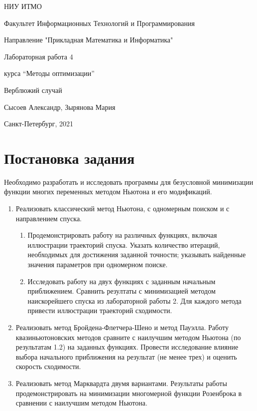 \documentclass[12pt]{article}
\begin{document}
\begin{titlepage}

\thispagestyle{empty}

\centerline{НИУ ИТМО}
\centerline{Факультет Информационных Технологий и Программирования}
\centerline{Направление "Прикладная Математика и Информатика"}

\vfill

\centerline{\huge{Лабораторная работа 4}}
\centerline{\large{курса ``Методы оптимизации'' }}
\vspace{1cm} 
\centerline{\large{Верблюжий случай}}
\centerline{\large{Сысоев Александр, Зырянова Мария}}
\vfill

\centerline{Санкт-Петербург, 2021}
\clearpage
\end{titlepage}

\section{Постановка задания}

Необходимо разработать и исследовать программы для безусловной минимизации функции многих переменных методом Ньютона и его модификаций.

\begin{enumerate}
	\item Реализовать классический метод Ньютона, с одномерным поиском и с направлением спуска. 
		\begin{enumerate}
			\item Продемонстрировать работу на различных функциях, включая иллюстрации траекторий спуска. Указать количество итераций, необходимых для достижения заданной точности; указывать найденные значения параметров при одномерном поиске.
			\item Исследовать работу на двух функциях с заданным начальным приближением. Сравнить резултаты с минимизацией методом наискорейшего спуска из лабораторной работы 2. Для каждого метода привести иллюстрации траекторий сходимости.
		\end{enumerate}				
	\item Реализовать метод Бройдена-Флетчера-Шено и метод Пауэлла. Работу квазиньютоновских методов сравните с наилучшим методом Ньютона
(по результатам 1.2) на заданных функциях. Провести исследование влияние выбора начального приближения на результат (не менее трех) и оценить скорость сходимости.
	\item Реализовать метод Марквардта двумя вариантами. Результаты работы продемонстрировать на минимизации многомерной функции
Розенброка в сравнении с наилучшим методом Ньютона.
\end{enumerate}
\end{document}
